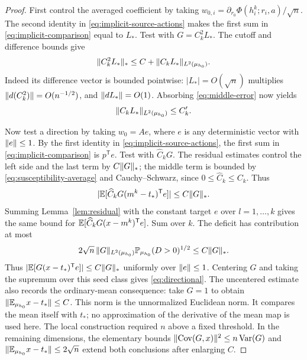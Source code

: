 \begin{proof}
First control the averaged coefficient by taking
$w_{0,i}=\partial_{r_0}\Phi(h_i^k;r_i,a)/\sqrt n$.
The second identity in \eqref{eq:implicit-source-actions} makes the first
sum in \eqref{eq:implicit-comparison} equal to $L_*$.
Test with $G=C_k^2L_*$. The cutoff and difference bounds give
\[
 \lVert C_k^2L_*\rVert_*\le C+\lVert C_kL_*\rVert_{L^2(\mu_{h_0})}.
\]
Indeed its difference vector is bounded pointwise: $|L_*|=O(\sqrt n)$
multiplies $\lVert d(C_k^2)\rVert=O(n^{-1/2})$, and $\lVert dL_*\rVert=O(1)$.
Absorbing \eqref{eq:middle-error} now yields
\begin{equation}\label{eq:susceptibility-average}
 \lVert C_kL_*\rVert_{L^2(\mu_{h_0})}\le C_k'.
\end{equation}

Now test a direction by taking $w_0=Ae$, where $e$ is any deterministic
vector with $\lVert e\rVert\le1$. By the first identity in
\eqref{eq:implicit-source-actions}, the first sum in
\eqref{eq:implicit-comparison} is $p^{\mathsf T}e$.
Test with $\widehat C_kG$. The residual estimates control the left side
and the last term by $C\lVert G\rVert_*$; the middle term is bounded by
\eqref{eq:susceptibility-average} and Cauchy--Schwarz, since
$0\le\widehat C_k\le C_k$. Thus
\[
 \lvert \mathbb E[\widehat C_kG(m^k-t_*)^{\mathsf T}e]\rvert\le C\lVert G\rVert_*.
\]
Summing Lemma~\ref{lem:residual} with the constant target $e$ over
$l=1,\ldots,k$ gives the same bound for
$\mathbb E[\widehat C_kG(x-m^k)^{\mathsf T}e]$.
Sum over $k$. The deficit has contribution at most
\[
 2\sqrt n\,\lVert G\rVert_{L^2(\mu_{h_0})}
       \mathbb P_{\mu_{h_0}}(D>0)^{1/2}\le C\lVert G\rVert_*.
\]
Thus $|\mathbb E[G(x-t_*)^{\mathsf T}e]|\le C\lVert G\rVert_*$ uniformly over
$\lVert e\rVert\le1$. Centering $G$ and taking the supremum over this seed
class gives \eqref{eq:directional}. The uncentered estimate also records
the ordinary-mean consequence: take $G=1$ to obtain
$\lVert \mathbb E_{\mu_{h_0}}x-t_*\rVert\le C$. This norm is the unnormalized
Euclidean norm. It compares the mean itself with $t_*$; no
approximation of the derivative of the mean map is used here.
The local construction required $n$ above a fixed threshold. In the
remaining dimensions, the elementary bounds
$\lVert \operatorname{Cov}(G,x)\rVert^2\le n\operatorname{Var}(G)$ and
$\lVert \mathbb E_{\mu_{h_0}}x-t_*\rVert\le2\sqrt n$ extend both conclusions after
enlarging $C$.
\end{proof}

